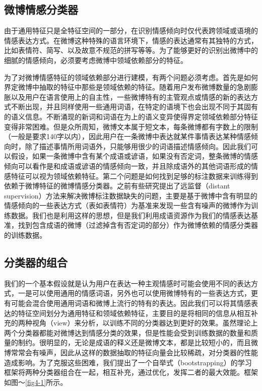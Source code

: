 \subsection{微博情感分类器}
\label{context}
由于通用特征只是全特征空间的一部分，在识别情感倾向时仅代表跨领域或语境的情感表达方式。在微博这种特殊的语言环境下，情感的表达通常有其独特的方式，比如表情符、简写、以及故意不规范的拼写等等。为了能够更好的识别出微博中的细腻的情感倾向，必须要考虑微博中领域依赖部分的特征。

为了对微博情感特征的领域依赖部分进行建模，有两个问题必须考虑。首先是如何界定微博中抽取的特征中那些是领域依赖的特征。随着用户发布微博数量的急剧膨胀以及用户在语言使用上的自主性，一些微博特有的主管观点或情感的新的表达方式不断出现，并且同样使用一些通用词语，在特定的语境下也会出现不同于其固有的语义信息。不断涌现的新词和词语在为上的语义变异使得界定领域依赖部分特征变得非常困难。但是众所周知，微博文本属于短文本，每条微博都有字数上的限制（一般是要求140字以内），因此用户在一条微博中表达就某件事情表达某种情感倾向时，除了描述事情所用词语外，只能够用很少的词语描述情感倾向。因此我们可以假设，如果一条微博中含有某个成语或谚语，如果没有否定词，整条微博的情感倾向可以看作是和成语或谚语的情感倾向一致，并且除成语外的其他词语形成的情感特征可以视为领域依赖特征。第二个问题是如何找到足够的标注数据来训练得到依赖于微博特征的微博情感分类器。之前有些研究提出了远监督（distant supervision）方法来解决微博标注数据缺失的问题，主要是基于微博中含有明显的情感倾向的一些表达方式（表如表情符）为基准来发现一些含有噪声的微博作为训练数据。我们也是利用这样的思想，但是我们利用成语资源作为我们的情感表达基准，找到包含成语的微博（过滤掉含有否定词的部分）作为微博依赖的情感分类器的训练数据。

\subsection{分类器的组合}
\label{combination}
我们的一个基本假设就是认为用户在表达一种主观情感时可能会使用不同的表达方式，一是可以使用通用的情感词语，另外也可以使用微博特有的一些表达方式，更有可能会混合使用通用词语和微博上流行的特有的表达。因此我们可以将其情感表达的特征空间划分为通用特征和领域依赖特征，主要目的是将相同的信息从相互补充的两种视角（view）来分析，以训练不同的分类器达到更好的效果。虽然理论上两个分类器都能对微博达到情感分类的效果，但是性能会受到训练数据的数量和质量的制约。很明显的，无论是成语的释义还是微博文本，都是比较短小的，而且微博常常会有噪声，因此从这样的数据抽取的特征向量会比较稀疏，对分类器的性能造成影响。为了克服这些困难，我们提出了一个自举式（bootstrapping）的学习框架将两种分类器组合在一起，相互补充，通过优化，发挥二者的最大效能。框架如图～\ref{fig4-1}所示。

